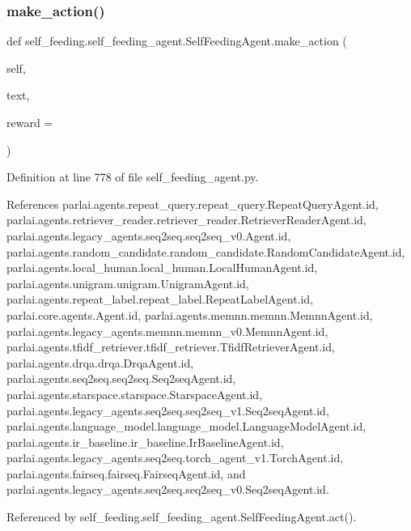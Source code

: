 \subsubsection{\texorpdfstring{make\+\_\+action()}{make\_action()}}
{\footnotesize\ttfamily def self\+\_\+feeding.\+self\+\_\+feeding\+\_\+agent.\+Self\+Feeding\+Agent.\+make\+\_\+action (\begin{DoxyParamCaption}\item[{}]{self,  }\item[{}]{text,  }\item[{}]{reward = {} }\end{DoxyParamCaption})}



Definition at line 778 of file self\+\_\+feeding\+\_\+agent.\+py.



References parlai.\+agents.\+repeat\+\_\+query.\+repeat\+\_\+query.\+Repeat\+Query\+Agent.\+id, parlai.\+agents.\+retriever\+\_\+reader.\+retriever\+\_\+reader.\+Retriever\+Reader\+Agent.\+id, parlai.\+agents.\+legacy\+\_\+agents.\+seq2seq.\+seq2seq\+\_\+v0.\+Agent.\+id, parlai.\+agents.\+random\+\_\+candidate.\+random\+\_\+candidate.\+Random\+Candidate\+Agent.\+id, parlai.\+agents.\+local\+\_\+human.\+local\+\_\+human.\+Local\+Human\+Agent.\+id, parlai.\+agents.\+unigram.\+unigram.\+Unigram\+Agent.\+id, parlai.\+agents.\+repeat\+\_\+label.\+repeat\+\_\+label.\+Repeat\+Label\+Agent.\+id, parlai.\+core.\+agents.\+Agent.\+id, parlai.\+agents.\+memnn.\+memnn.\+Memnn\+Agent.\+id, parlai.\+agents.\+legacy\+\_\+agents.\+memnn.\+memnn\+\_\+v0.\+Memnn\+Agent.\+id, parlai.\+agents.\+tfidf\+\_\+retriever.\+tfidf\+\_\+retriever.\+Tfidf\+Retriever\+Agent.\+id, parlai.\+agents.\+drqa.\+drqa.\+Drqa\+Agent.\+id, parlai.\+agents.\+seq2seq.\+seq2seq.\+Seq2seq\+Agent.\+id, parlai.\+agents.\+starspace.\+starspace.\+Starspace\+Agent.\+id, parlai.\+agents.\+legacy\+\_\+agents.\+seq2seq.\+seq2seq\+\_\+v1.\+Seq2seq\+Agent.\+id, parlai.\+agents.\+language\+\_\+model.\+language\+\_\+model.\+Language\+Model\+Agent.\+id, parlai.\+agents.\+ir\+\_\+baseline.\+ir\+\_\+baseline.\+Ir\+Baseline\+Agent.\+id, parlai.\+agents.\+legacy\+\_\+agents.\+seq2seq.\+torch\+\_\+agent\+\_\+v1.\+Torch\+Agent.\+id, parlai.\+agents.\+fairseq.\+fairseq.\+Fairseq\+Agent.\+id, and parlai.\+agents.\+legacy\+\_\+agents.\+seq2seq.\+seq2seq\+\_\+v0.\+Seq2seq\+Agent.\+id.



Referenced by self\+\_\+feeding.\+self\+\_\+feeding\+\_\+agent.\+Self\+Feeding\+Agent.\+act().

